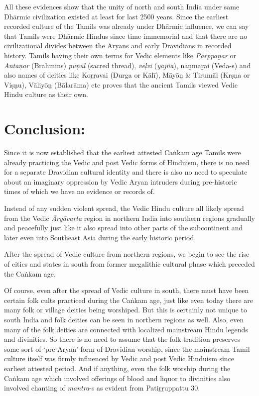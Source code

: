 All these evidences show that the unity of north and south India under same Dhārmic civilization existed at least for last 2500 years. Since the earliest recorded culture of the Tamils was already under Dhārmic influence, we can say that Tamils were Dhārmic Hindus since time immemorial and that there are no civilizational divides between the Aryans and early Dravidians in recorded history. Tamils having their own terms for Vedic elements like \textit{Pārppaṉar} or \textit{Antaṇar} (Brahmins) \textit{pūṇūl} (sacred thread), \textit{vēḷvi} (\textit{yajña}), nāṉmaṟai (Veda-s) and also names of deities like Koṟṟavai (Durga or Kālī), Māyōṉ \& Tirumāl (Krṣṇa or Viṣṇu), Vāliyōṉ (Bālarāma) etc proves that the ancient Tamils viewed Vedic Hindu culture as their own.


\section*{Conclusion:}

Since it is now established that the earliest attested Caṅkam age Tamils were already practicing the Vedic and post Vedic forms of Hinduism, there is no need for a separate Dravidian cultural identity and there is also no need to speculate about an imaginary oppression by Vedic Aryan intruders during pre-historic times of which we have no evidence or records of.

Instead of any sudden violent spread, the Vedic Hindu culture all likely spread from the Vedic \textit{Āryāvarta} region in northern India into southern regions gradually and peacefully just like it also spread into other parts of the subcontinent and later even into Southeast Asia during the early historic period.

After the spread of Vedic culture from northern regions, we begin to see the rise of cities and states in south from former megalithic cultural phase which preceded the Caṅkam age.

Of course, even after the spread of Vedic culture in south, there must have been certain folk cults practiced during the Caṅkam age, just like even today there are many folk or village deities being worshiped. But this is certainly not unique to south India and folk deities can be seen in northern regions as well. Also, even many of the folk deities are connected with localized mainstream Hindu legends and divinities. So there is no need to assume that the folk tradition preserves some sort of ‘pre-Aryan’ form of Dravidian worship, since the mainstream Tamil culture itself was firmly influenced by Vedic and post Vedic Hinduism since earliest attested period. And if anything, even the folk worship during the Caṅkam age which involved offerings of blood and liquor to divinities also involved chanting of \textit{mantra}-s as evident from Patiṟṟuppattu 30.

